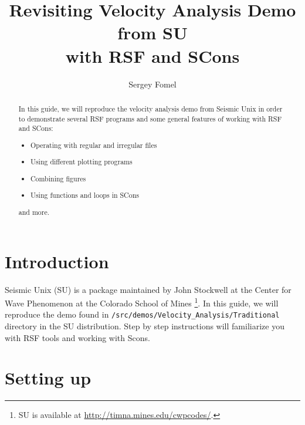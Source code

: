 \title{Revisiting Velocity Analysis Demo from SU \\ with RSF and SCons}


\author{Sergey Fomel}



\maketitle

\begin{abstract}
In this guide, we will reproduce the velocity analysis demo from
Seismic Unix in order to demonstrate several RSF programs and 
some general features of working with RSF and SCons:
\begin{itemize}
  \item Operating with regular and irregular files
  \item Using different plotting programs
  \item Combining figures
  \item Using functions and loops in SCons
\end{itemize}
and more.
\end{abstract}

\section{Introduction}

Seismic Unix (SU) is a package maintained by John Stockwell at the
Center for Wave Phenomenon at the Colorado School of Mines
\cite[]{TLE16-07-10451049,su}\footnote{SU is available at
\url{http://timna.mines.edu/cwpcodes/}.}. In this guide, we will
reproduce the demo found in
\texttt{/src/demos/Velocity\_Analysis/Traditional} directory in the SU
distribution. Step by step instructions will familiarize you with RSF
tools and working with Scons.



\section{Setting up}

